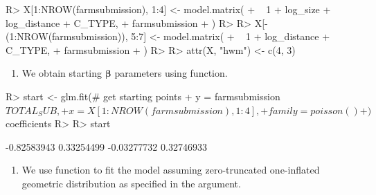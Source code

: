 \documentclass[
]{jss}
\providecommand{\tightlist}{%
  \setlength{\itemsep}{0pt}\setlength{\parskip}{0pt}}
\newcommand{\1}{\mathcal{I}} \newcommand{\bZero}{\boldsymbol{0}}
\begin{document}
\begin{CodeChunk}
\begin{CodeInput}
R> X[1:NROW(farmsubmission), 1:4] <- model.matrix(
+   ~ 1 + log_size + log_distance + C_TYPE, 
+   farmsubmission
+ )
R> 
R> X[-(1:NROW(farmsubmission)), 5:7] <- model.matrix(
+   ~ 1 + log_distance + C_TYPE, 
+   farmsubmission
+ )
R> 
R> attr(X, "hwm") <- c(4, 3)
\end{CodeInput}
\end{CodeChunk}

\begin{enumerate}
\def\labelenumi{\arabic{enumi}.}
\setcounter{enumi}{2}
\tightlist
\item
  We obtain starting \(\boldsymbol{\beta}\) parameters using
   function.
\end{enumerate}

\begin{CodeChunk}
\begin{CodeInput}
R> start <- glm.fit(# get starting points
+   y = farmsubmission$TOTAL_SUB, 
+   x = X[1:NROW(farmsubmission), 1:4], 
+   family = poisson()
+ )$coefficients
R> 
R> start
\end{CodeInput}
\begin{CodeOutput}
[1] -0.82583943  0.33254499 -0.03277732  0.32746933
\end{CodeOutput}
\end{CodeChunk}

\begin{enumerate}
\def\labelenumi{\arabic{enumi}.}
\setcounter{enumi}{3}
\tightlist
\item
  We use  function to fit the model assuming
  zero-truncated one-inflated geometric distribution as specified in the
   argument.
\end{enumerate}

\begin{CodeChunk}
\end{CodeChunk}
\end{document}

